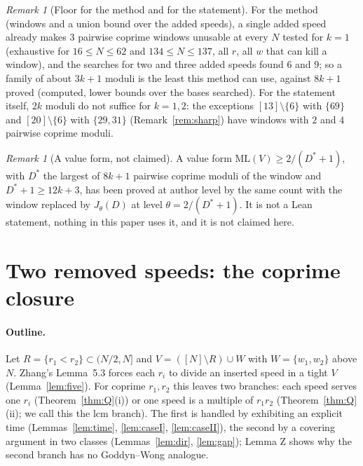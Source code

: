 \documentclass[11pt]{article}
\theoremstyle{definition}
\theoremstyle{remark}
\newtheorem{remark}[theorem]{Remark}
\newcommand{\ML}{\mathrm{ML}}
\begin{document}
\begin{remark}[Floor for the method and for the statement]\label{rem:floor}
For the method (windows and a union bound over the added speeds), a single added speed already makes $3$ pairwise coprime windows unusable at every $N$ tested for $k=1$ (exhaustive for $16\le N\le62$ and $134\le N\le137$, all $r$, all $w$ that can kill a window), and the searches for two and three added speeds found $6$ and $9$; so a family of about $3k+1$ moduli is the least this method can use, against $8k+1$ proved (computed, lower bounds over the bases searched). For the statement itself, $2k$ moduli do not suffice for $k=1,2$: the exceptions $[13]\setminus\{6\}$ with $\{69\}$ and $[20]\setminus\{6\}$ with $\{29,31\}$ (Remark~\ref{rem:sharp}) have windows with $2$ and $4$ pairwise coprime moduli.
\end{remark}

\begin{remark}[A value form, not claimed]\label{rem:lin}
A value form $\ML(V)\ge2/(D^*+1)$, with $D^*$ the largest of $8k+1$ pairwise coprime moduli of the window and $D^*+1\ge12k+3$, has been proved at author level by the same count with the window replaced by $J_\theta(D)$ at level $\theta=2/(D^*+1)$. It is not a Lean statement, nothing in this paper uses it, and it is not claimed here.
\end{remark}


\section{Two removed speeds: the coprime closure}\label{sec:Q}

\paragraph{Outline.}
Let $R=\{r_1<r_2\}\subset(N/2,N]$ and $V=([N]\setminus R)\cup W$ with $W=\{w_1,w_2\}$ above $N$. Zhang's Lemma~5.3 forces each $r_i$ to divide an inserted speed in a tight $V$ (Lemma~\ref{lem:five}). For coprime $r_1,r_2$ this leaves two branches: each speed serves one $r_i$ (Theorem~\ref{thm:Q}(i)) or one speed is a multiple of $r_1r_2$ (Theorem~\ref{thm:Q}(ii); we call this the lcm branch). The first is handled by exhibiting an explicit time (Lemmas~\ref{lem:time}, \ref{lem:caseI}, \ref{lem:caseII}), the second by a covering argument in two classes (Lemmas~\ref{lem:dir}, \ref{lem:gap}); Lemma Z shows why the second branch has no Goddyn--Wong analogue.
\end{document}
